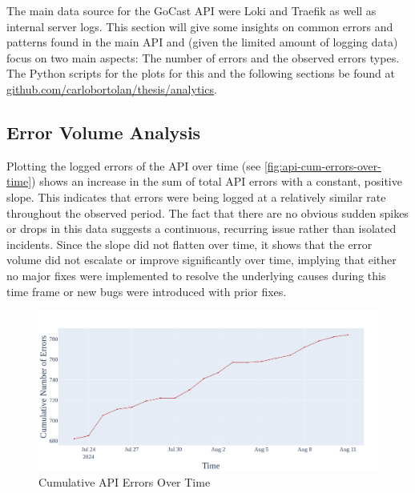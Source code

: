 The main data source for the GoCast \ac{API} were Loki and Traefik as well as internal server logs. This section will give some insights on common errors and patterns found in the main \ac{API} and (given the limited amount of logging data) focus on two main aspects: The number of errors and the observed errors types. The Python scripts for the plots for this and the following sections be found at \href{https://github.com/carlobortolan/Thesis/tree/analytics}{github.com/carlobortolan/thesis/analytics}.

\subsection{Error Volume Analysis}

Plotting the logged errors of the \ac{API} over time (see \autoref{fig:api-cum-errors-over-time}) shows an increase in the sum of total \ac{API} errors with a constant, positive slope. This indicates that errors were being logged at a relatively similar rate throughout the observed period. The fact that there are no obvious sudden spikes or drops in this data suggests a continuous, recurring issue rather than isolated incidents. Since the slope did not flatten over time, it shows that the error volume did not escalate or improve significantly over time, implying that either no major fixes were implemented to resolve the underlying causes during this time frame or new bugs were introduced with prior fixes.

\begin{figure}[htpb]
    \centering
    \includegraphics[width=\linewidth]{images/plots/api/cum_errors_over_time.png}
    \caption[Cumulative \ac{API} Errors Over Time]{Cumulative \ac{API} Errors Over Time}\label{fig:api-cum-errors-over-time}
\end{figure}


